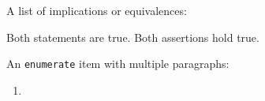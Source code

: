 A list of implications or equivalences:
\begin{implicationslist}
		Both statements are true.
		Both assertions hold true.
\end{implicationslist}
An \texttt{enumerate} item with multiple paragraphs:
\begin{enumerate}
	\item
		\lipsum[1-2]
\end{enumerate}
